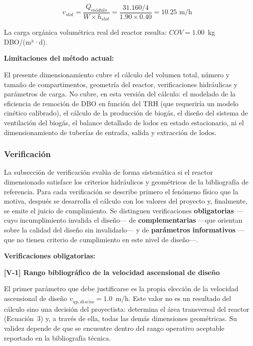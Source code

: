 \documentclass[12pt,a4paper]{article}
\begin{document}
\begin{equation}
v_{slot} = \frac{Q_{módulo}}{W \times h_{slot}} = \frac{31.160 / 4}{1.90 \times 0.40} = 10.25 \text{ m/h}
\end{equation}

La carga orgánica volumétrica real del reactor resulta: $COV = 1.00$~kg\,DBO/(m³·d). 

\textbf{Limitaciones del método actual:}

El presente dimensionamiento cubre el cálculo del volumen total, número y tamaño de compartimentos, geometría del reactor, verificaciones hidráulicas y parámetros de carga. No cubre, en esta versión del cálculo: el modelado de la eficiencia de remoción de DBO en función del TRH (que requeriría un modelo cinético calibrado), el cálculo de la producción de biogás, el diseño del sistema de ventilación del biogás, el balance detallado de lodos en estado estacionario, ni el dimensionamiento de tuberías de entrada, salida y extracción de lodos.

\subsubsection{Verificación}

La subsección de verificación evalúa de forma sistemática si el reactor dimensionado satisface los criterios hidráulicos y geométricos de la bibliografía de referencia. Para cada verificación se describe primero el fenómeno físico que la motiva, después se desarrolla el cálculo con los valores del proyecto y, finalmente, se emite el juicio de cumplimiento. Se distinguen verificaciones \textbf{obligatorias} ---cuyo incumplimiento invalida el diseño--- de \textbf{complementarias} ---que orientan sobre la calidad del diseño sin invalidarlo--- y de \textbf{parámetros informativos} ---que no tienen criterio de cumplimiento en este nivel de diseño---.

\textbf{Verificaciones obligatorias:}

\textbf{[V-1] Rango bibliográfico de la velocidad ascensional de diseño}

El primer parámetro que debe justificarse es la propia elección de la velocidad ascensional de diseño $v_{up,dise\tilde{n}o} = 1.0$~m/h. Este valor no es un resultado del cálculo sino una decisión del proyectista: determina el área transversal del reactor (Ecuación~3) y, a través de ella, todas las demás dimensiones geométricas. Su validez depende de que se encuentre dentro del rango operativo aceptable reportado en la bibliografía técnica.
\end{document}
